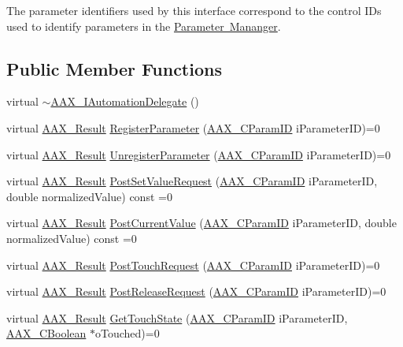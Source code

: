 The parameter identifiers used by this interface correspond to the control I\+Ds used to identify parameters in the \mbox{\hyperlink{a01545}{Parameter Mananger}}. \subsection*{Public Member Functions}
\begin{DoxyCompactItemize}
\item 
virtual \mbox{\hyperlink{a01773_a566c6c261d00207024a07990c86f9694}{$\sim$\+A\+A\+X\+\_\+\+I\+Automation\+Delegate}} ()
\item 
virtual \mbox{\hyperlink{a00392_a4d8f69a697df7f70c3a8e9b8ee130d2f}{A\+A\+X\+\_\+\+Result}} \mbox{\hyperlink{a01773_a4d91efb2d922729d02e2ea7d7a05ed10}{Register\+Parameter}} (\mbox{\hyperlink{a00392_a1440c756fe5cb158b78193b2fc1780d1}{A\+A\+X\+\_\+\+C\+Param\+ID}} i\+Parameter\+ID)=0
\item 
virtual \mbox{\hyperlink{a00392_a4d8f69a697df7f70c3a8e9b8ee130d2f}{A\+A\+X\+\_\+\+Result}} \mbox{\hyperlink{a01773_ab1c1d4292460119b22d68247150cc1a0}{Unregister\+Parameter}} (\mbox{\hyperlink{a00392_a1440c756fe5cb158b78193b2fc1780d1}{A\+A\+X\+\_\+\+C\+Param\+ID}} i\+Parameter\+ID)=0
\item 
virtual \mbox{\hyperlink{a00392_a4d8f69a697df7f70c3a8e9b8ee130d2f}{A\+A\+X\+\_\+\+Result}} \mbox{\hyperlink{a01773_a9d0e2c5d57d177a4dca0ff10cde0256c}{Post\+Set\+Value\+Request}} (\mbox{\hyperlink{a00392_a1440c756fe5cb158b78193b2fc1780d1}{A\+A\+X\+\_\+\+C\+Param\+ID}} i\+Parameter\+ID, double normalized\+Value) const =0
\item 
virtual \mbox{\hyperlink{a00392_a4d8f69a697df7f70c3a8e9b8ee130d2f}{A\+A\+X\+\_\+\+Result}} \mbox{\hyperlink{a01773_a20cb518bb470b6f4cadf58e4af64ac96}{Post\+Current\+Value}} (\mbox{\hyperlink{a00392_a1440c756fe5cb158b78193b2fc1780d1}{A\+A\+X\+\_\+\+C\+Param\+ID}} i\+Parameter\+ID, double normalized\+Value) const =0
\item 
virtual \mbox{\hyperlink{a00392_a4d8f69a697df7f70c3a8e9b8ee130d2f}{A\+A\+X\+\_\+\+Result}} \mbox{\hyperlink{a01773_a30fdb67042b8dc9fb42fa9023ed9cce0}{Post\+Touch\+Request}} (\mbox{\hyperlink{a00392_a1440c756fe5cb158b78193b2fc1780d1}{A\+A\+X\+\_\+\+C\+Param\+ID}} i\+Parameter\+ID)=0
\item 
virtual \mbox{\hyperlink{a00392_a4d8f69a697df7f70c3a8e9b8ee130d2f}{A\+A\+X\+\_\+\+Result}} \mbox{\hyperlink{a01773_a89049fae2c35a4b99cfeb6585898bb69}{Post\+Release\+Request}} (\mbox{\hyperlink{a00392_a1440c756fe5cb158b78193b2fc1780d1}{A\+A\+X\+\_\+\+C\+Param\+ID}} i\+Parameter\+ID)=0
\item 
virtual \mbox{\hyperlink{a00392_a4d8f69a697df7f70c3a8e9b8ee130d2f}{A\+A\+X\+\_\+\+Result}} \mbox{\hyperlink{a01773_a4436f06c72d61217cbbfc7c233501f29}{Get\+Touch\+State}} (\mbox{\hyperlink{a00392_a1440c756fe5cb158b78193b2fc1780d1}{A\+A\+X\+\_\+\+C\+Param\+ID}} i\+Parameter\+ID, \mbox{\hyperlink{a00392_aa216506530f1d19a2965931ced2b274b}{A\+A\+X\+\_\+\+C\+Boolean}} $\ast$o\+Touched)=0
\end{DoxyCompactItemize}



